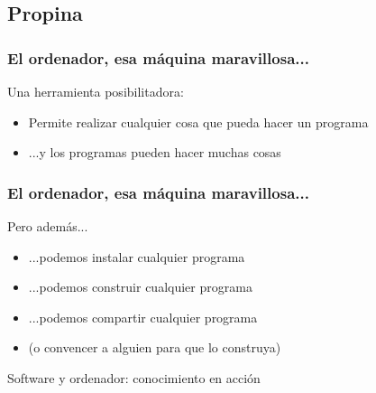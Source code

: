 \documentclass[17pt,aspectratio=169]{beamer}
\renewcommand{\secimage}{figs/bookpages}
\newcommand{\secimage}{figs/bookpages}
\begin{document}
\renewcommand{\secimage}{figs/tipjar}
{\bf
  \textcolor[rgb]{1,1,1}{
    \section{Propina}
  }
}


\begin{frame}
\frametitle{El ordenador, esa máquina maravillosa...}

Una herramienta posibilitadora:

\begin{itemize}
\item Permite realizar cualquier cosa que pueda hacer un programa
\item ...y los programas pueden hacer muchas cosas
\end{itemize}


\end{frame}


\begin{frame}
\frametitle{El ordenador, esa máquina maravillosa...}

Pero además...

\begin{itemize}
\item ...podemos instalar cualquier programa
\item ...podemos construir cualquier programa
\item ...podemos compartir cualquier programa
\item (o convencer a alguien para que lo construya)
\end{itemize}

\vspace{.2cm}

\begin{center}
Software y ordenador: conocimiento en acción
\end{center}
\end{frame}

\end{document}
